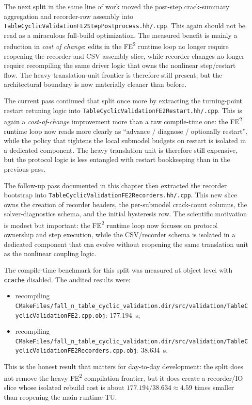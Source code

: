 The next split in the same line of work moved the post-step crack-summary
aggregation and recorder-row assembly into
\texttt{TableCyclicValidationFE2StepPostprocess}\allowbreak\texttt{.hh/.cpp}.
This again should not be read as a miraculous full-build optimization.  The
measured benefit is mainly a reduction in \emph{cost of change}: edits in the
FE\textsuperscript{2} runtime loop no longer require reopening the recorder and
CSV assembly slice, while recorder changes no longer require recompiling the
same driver logic that owns the nonlinear step/restart flow.  The heavy
translation-unit frontier is therefore still present, but the architectural
boundary is now materially cleaner than before.

The current pass continued that split once more by extracting the turning-point
restart retuning logic into
\texttt{TableCyclicValidationFE2Restart}\allowbreak\texttt{.hh/.cpp}.  This is
again a \emph{cost-of-change} improvement more than a raw compile-time one:
the FE\textsuperscript{2} runtime loop now reads more clearly as
``advance / diagnose / optionally restart'', while the policy that tightens the
local submodel budgets on restart is isolated in a dedicated component.  The
heavy translation unit is therefore still expensive, but the protocol logic is
less entangled with restart bookkeeping than in the previous pass.

The follow-up pass documented in this chapter then extracted the recorder
bootstrap into
\texttt{TableCyclicValidationFE2Recorders}\allowbreak\texttt{.hh/.cpp}.  This
new slice owns the creation of recorder headers, the per-submodel crack-count
columns, the solver-diagnostics schema, and the initial hysteresis row.  The
scientific motivation is modest but important: the FE\textsuperscript{2}
runtime loop now focuses on protocol ownership and step execution, while the
CSV/recorder schema is isolated in a dedicated component that can evolve
without reopening the same translation unit as the nonlinear coupling logic.

The compile-time benchmark for this split was measured at object level with
\texttt{ccache} disabled.  The audited results were:
\begin{itemize}
  \item recompiling
    \texttt{CMakeFiles/fall\_n\_table\_cyclic\_validation.dir/src/validation/TableCyclicValidationFE2.cpp.obj}:
    177.194~s;
  \item recompiling
    \texttt{CMakeFiles/fall\_n\_table\_cyclic\_validation.dir/src/validation/TableCyclicValidationFE2Recorders.cpp.obj}:
    38.634~s.
\end{itemize}
This is the honest result that matters for day-to-day development: the split
does not remove the heavy FE\textsuperscript{2} compilation frontier, but it
does create a recorder/IO slice whose isolated rebuild cost is about
\(177.194/38.634 \approx 4.59\) times smaller than reopening the main
runtime TU.

